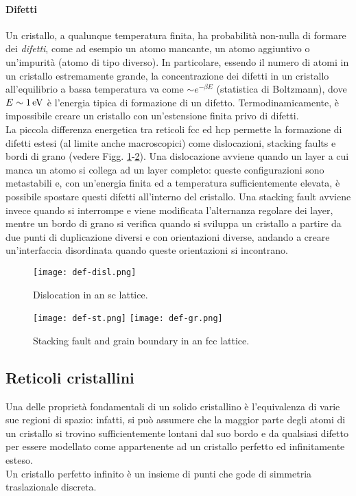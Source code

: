 \paragraph{Difetti}

Un cristallo, a qualunque temperatura finita, ha probabilità non-nulla di formare dei \textit{difetti}, come ad esempio un atomo mancante, un atomo aggiuntivo o un'impurità (atomo di tipo diverso). In particolare, essendo il numero di atomi in un cristallo estremamente grande, la concentrazione dei difetti in un cristallo all'equilibrio a bassa temperatura va come $ \sim e^{- \beta E} $ (statistica di Boltzmann), dove $ E \sim 1 \,\mathrm{eV} $ è l'energia tipica di formazione di un difetto. Termodinamicamente, è impossibile creare un cristallo con un'estensione finita privo di difetti. \\
La piccola differenza energetica tra reticoli fcc ed hcp permette la formazione di difetti estesi (al limite anche macroscopici) come dislocazioni, stacking faults e bordi di grano (vedere Figg. \ref{def-disl}-\ref{def-st-gr}). Una dislocazione avviene quando un layer a cui manca un atomo si collega ad un layer completo: queste configurazioni sono metastabili e, con un'energia finita ed a temperatura sufficientemente elevata, è possibile spostare questi difetti all'interno del cristallo. Una stacking fault avviene invece quando si interrompe e viene modificata l'alternanza regolare dei layer, mentre un bordo di grano si verifica quando si sviluppa un cristallo a partire da due punti di duplicazione diversi e con orientazioni diverse, andando a creare un'interfaccia disordinata quando queste orientazioni si incontrano.

\begin{figure}[!h]
	\centering
	\texttt{[image: def-disl.png]}
	\caption{Dislocation in an sc lattice.}
	\label{def-disl}
\end{figure}
\begin{figure}[!h]
	\centering
	\texttt{[image: def-st.png]}
	\qquad \qquad
	\texttt{[image: def-gr.png]}
	\caption{Stacking fault and grain boundary in an fcc lattice.}
	\label{def-st-gr}
\end{figure}

\subsection{Reticoli cristallini}

Una delle proprietà fondamentali di un solido cristallino è l'equivalenza di varie sue regioni di spazio: infatti, si può assumere che la maggior parte degli atomi di un cristallo si trovino sufficientemente lontani dal suo bordo e da qualsiasi difetto per essere modellato come appartenente ad un cristallo perfetto ed infinitamente esteso. \\
Un cristallo perfetto infinito è un insieme di punti che gode di simmetria traslazionale discreta.

